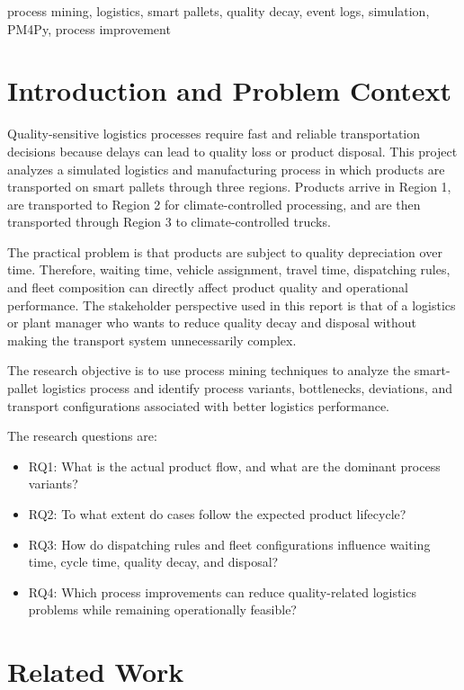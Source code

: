 \documentclass[conference]{IEEEtran}
\begin{document}
\begin{IEEEkeywords}
process mining, logistics, smart pallets, quality decay, event logs, simulation, PM4Py, process improvement
\end{IEEEkeywords}

\section{Introduction and Problem Context}

Quality-sensitive logistics processes require fast and reliable transportation decisions because delays can lead to quality loss or product disposal. This project analyzes a simulated logistics and manufacturing process in which products are transported on smart pallets through three regions. Products arrive in Region 1, are transported to Region 2 for climate-controlled processing, and are then transported through Region 3 to climate-controlled trucks.

The practical problem is that products are subject to quality depreciation over time. Therefore, waiting time, vehicle assignment, travel time, dispatching rules, and fleet composition can directly affect product quality and operational performance. The stakeholder perspective used in this report is that of a logistics or plant manager who wants to reduce quality decay and disposal without making the transport system unnecessarily complex.

The research objective is to use process mining techniques to analyze the smart-pallet logistics process and identify process variants, bottlenecks, deviations, and transport configurations associated with better logistics performance.

The research questions are:

\begin{itemize}
\item RQ1: What is the actual product flow, and what are the dominant process variants?
\item RQ2: To what extent do cases follow the expected product lifecycle?
\item RQ3: How do dispatching rules and fleet configurations influence waiting time, cycle time, quality decay, and disposal?
\item RQ4: Which process improvements can reduce quality-related logistics problems while remaining operationally feasible?
\end{itemize}

\section{Related Work}
\end{document}
